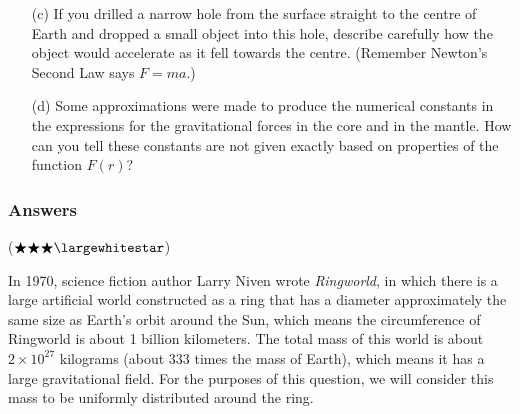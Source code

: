 \documentclass{exam}
\begin{document}
\begin{questions}
\begin{enumerate}
\item[(c)] If you drilled a narrow hole from the surface straight to the centre of Earth and dropped a small object into this hole, describe carefully how the object would accelerate as it fell towards the centre. (Remember Newton's Second Law says $F=ma$.)

\item[(d)] Some approximations were made to produce the numerical constants in the expressions for the gravitational forces in the core and in the mantle. How can you tell these constants are not given exactly based on properties of the function $F(r)$?

\end{enumerate}

\color{blue}
\subsubsection*{Answers}
\color{black}

\question ($\bigstar \bigstar \bigstar \largewhitestar$) 

In 1970, science fiction author Larry Niven wrote \textit{Ringworld}, in which there is a large artificial world constructed as a ring that has a diameter approximately the same size as Earth's orbit around the Sun, which means the circumference of Ringworld is about 1 billion kilometers. The total mass of this world is about $2 \times 10^{27}$ kilograms (about 333 times the mass of Earth), which means it has a large gravitational field. For the purposes of this question, we will consider this mass to be uniformly distributed around the ring.


\end{questions}
\end{document}
